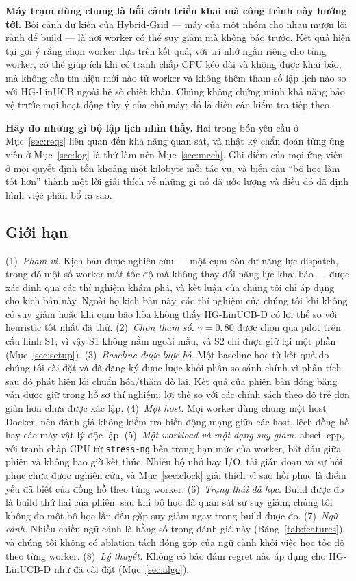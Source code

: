 \documentclass[final,5p,times,twocolumn]{elsarticle}
\begin{document}
\textbf{Máy trạm dùng chung là bối cảnh triển khai mà công trình này hướng tới.} Bối cảnh dự kiến của Hybrid-Grid --- máy của một nhóm cho nhau mượn lõi rảnh để build --- là nơi worker có thể suy giảm mà không báo trước. Kết quả hiện tại gợi ý rằng chọn worker dựa trên kết quả, với trí nhớ ngắn riêng cho từng worker, có thể giúp ích khi có tranh chấp CPU kéo dài và không được khai báo, mà không cần tín hiệu mới nào từ worker và không thêm tham số lập lịch nào so với HG-LinUCB ngoài hệ số chiết khấu. Chúng không chứng minh khả năng bảo vệ trước mọi hoạt động tùy ý của chủ máy; đó là điều cần kiểm tra tiếp theo.

\textbf{Hãy đo những gì bộ lập lịch nhìn thấy.} Hai trong bốn yêu cầu ở Mục~\ref{sec:reqs} liên quan đến khả năng quan sát, và nhật ký chẩn đoán từng ứng viên ở Mục~\ref{sec:log} là thứ làm nên Mục~\ref{sec:mech}. Ghi điểm của mọi ứng viên ở mọi quyết định tốn khoảng một kilobyte mỗi tác vụ, và biến câu ``bộ học làm tốt hơn'' thành một lời giải thích về những gì nó đã ước lượng và điều đó đã định hình việc phân bổ ra sao.

\subsection{Giới hạn}
\label{sec:limitations}

(1)~\emph{Phạm vi.} Kịch bản được nghiên cứu --- một cụm còn dư năng lực dispatch, trong đó một số worker mất tốc độ mà không thay đổi năng lực khai báo --- được xác định qua các thí nghiệm khám phá, và kết luận của chúng tôi chỉ áp dụng cho kịch bản này. Ngoài họ kịch bản này, các thí nghiệm của chúng tôi khi không có suy giảm hoặc khi cụm bão hòa không thấy HG-LinUCB-D có lợi thế so với heuristic tốt nhất đã thử. (2)~\emph{Chọn tham số.} $\gamma=0{,}80$ được chọn qua pilot trên cấu hình S1; vì vậy S1 không nằm ngoài mẫu, và S2 chỉ được giữ lại một phần (Mục~\ref{sec:setup}). (3)~\emph{Baseline được lược bỏ.} Một baseline học từ kết quả do chúng tôi cài đặt và đã đăng ký được lược khỏi phần so sánh chính vì phân tích sau đó phát hiện lỗi chuẩn hóa/thăm dò lại. Kết quả của phiên bản đóng băng vẫn được giữ trong hồ sơ thí nghiệm; lợi thế so với các chính sách theo độ trễ đơn giản hơn chưa được xác lập. (4)~\emph{Một host.} Mọi worker dùng chung một host Docker, nên đánh giá không kiểm tra biến động mạng giữa các host, lệch đồng hồ hay các máy vật lý độc lập. (5)~\emph{Một workload và một dạng suy giảm.} abseil-cpp, với tranh chấp CPU từ \texttt{stress-ng} bên trong hạn mức của worker, bắt đầu giữa phiên và không bao giờ kết thúc. Nhiễu bộ nhớ hay I/O, tải gián đoạn và sự hồi phục chưa được nghiên cứu, và Mục~\ref{sec:clock} giải thích vì sao hồi phục là điểm yếu đã biết của đồng hồ theo từng worker. (6)~\emph{Trạng thái đã học.} Build được đo là build thứ hai của phiên, sau khi bộ học đã quan sát sự suy giảm; chúng tôi không đo một bộ học lần đầu gặp suy giảm ngay trong build được đo. (7)~\emph{Ngữ cảnh.} Nhiều chiều ngữ cảnh là hằng số trong đánh giá này (Bảng~\ref{tab:features}), và chúng tôi không có ablation tách đóng góp của ngữ cảnh khỏi việc học tốc độ theo từng worker. (8)~\emph{Lý thuyết.} Không có bảo đảm regret nào áp dụng cho HG-LinUCB-D như đã cài đặt (Mục~\ref{sec:algo}).
\end{document}
